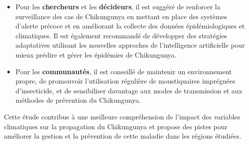 \begin{itemize}
	\item Pour les \textbf{chercheurs} et les \textbf{décideurs}, il est suggéré de renforcer la surveillance des cas de Chikungunya en mettant en place des systèmes d'alerte précoce et en améliorant la collecte des données épidémiologiques et climatiques. Il est également recommandé de développer des stratégies adaptatives utilisant les nouvelles approches de l'intelligence artificielle pour mieux prédire et gérer les épidémies de Chikungunya.
	\item Pour les \textbf{communautés}, il est conseillé de maintenir un environnement propre, de promouvoir l'utilisation régulière de moustiquaires imprégnées d'insecticide, et de sensibiliser davantage aux modes de transmission et aux méthodes de prévention du Chikungunya.
\end{itemize}

Cette étude contribue à une meilleure compréhension de l'impact des variables climatiques sur la propagation du Chikungunya et propose des pistes pour améliorer la gestion et la prévention de cette maladie dans les régions étudiées.







